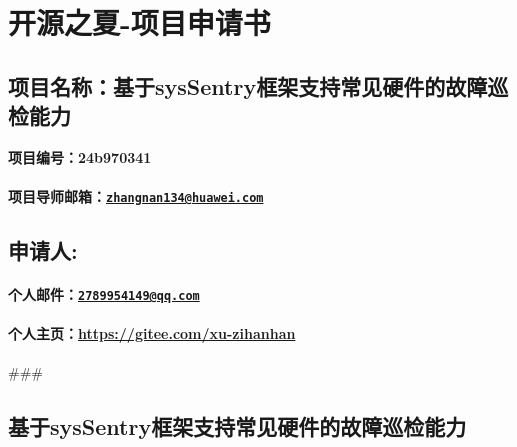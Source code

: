 \documentclass[
]{article}
\author{}
\date{}
\begin{document}
\section{开源之夏-项目申请书}\label{ux5f00ux6e90ux4e4bux590f-ux9879ux76eeux7533ux8bf7ux4e66}

\subsection{项目名称：基于sysSentry框架支持常见硬件的故障巡检能力}\label{ux9879ux76eeux540dux79f0ux57faux4e8esyssentryux6846ux67b6ux652fux6301ux5e38ux89c1ux786cux4ef6ux7684ux6545ux969cux5de1ux68c0ux80fdux529b}

\textbf{项目编号：24b970341}

\paragraph{\texorpdfstring{项目导师邮箱：\href{mailto:zhangnan134@huawei.com}{\nolinkurl{zhangnan134@huawei.com}}
}{项目导师邮箱：zhangnan134@huawei.com }}\label{ux9879ux76eeux5bfcux5e08ux90aeux7bb1zhangnan134huaweicom}

\subsection{\texorpdfstring{申请人:
}{申请人: }}\label{ux7533ux8bf7ux4eba}

\paragraph{\texorpdfstring{个人邮件：\href{mailto:2789954149@qq.com}{\nolinkurl{2789954149@qq.com}}}{个人邮件：2789954149@qq.com}}\label{ux4e2aux4ebaux90aeux4ef62789954149qqcom}

\paragraph{\texorpdfstring{个人主页：\url{https://gitee.com/xu-zihanhan}}{个人主页：https://gitee.com/xu-zihanhan}}\label{ux4e2aux4ebaux4e3bux9875httpsgiteecomxu-zihanhan}

\#\#\#

\subsection{基于sysSentry框架支持常见硬件的故障巡检能力}\label{ux57faux4e8esyssentryux6846ux67b6ux652fux6301ux5e38ux89c1ux786cux4ef6ux7684ux6545ux969cux5de1ux68c0ux80fdux529b}
\end{document}
